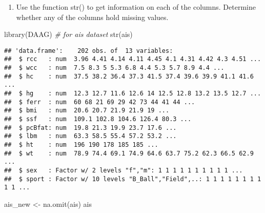 \documentclass[
]{article}
\newenvironment{Shaded}{\begin{snugshade}}{\end{snugshade}}
\newcommand{\CommentTok}[1]{\textcolor[rgb]{0.56,0.35,0.01}{\textit{#1}}}
\newcommand{\FunctionTok}[1]{\textcolor[rgb]{0.00,0.00,0.00}{#1}}
\newcommand{\NormalTok}[1]{#1}
\newcommand{\OtherTok}[1]{\textcolor[rgb]{0.56,0.35,0.01}{#1}}
\providecommand{\tightlist}{%
  \setlength{\itemsep}{0pt}\setlength{\parskip}{0pt}}
\begin{document}
\begin{enumerate}
\def\labelenumi{(\alph{enumi})}
\tightlist
\item
  Use the function str() to get information on each of the columns.
  Determine whether any of the columns hold missing values.
\end{enumerate}

\begin{Shaded}
\begin{Highlighting}[]
\FunctionTok{library}\NormalTok{(DAAG) }\CommentTok{\# for ais dataset}
\FunctionTok{str}\NormalTok{(ais)}
\end{Highlighting}
\end{Shaded}

\begin{verbatim}
## 'data.frame':    202 obs. of  13 variables:
##  $ rcc   : num  3.96 4.41 4.14 4.11 4.45 4.1 4.31 4.42 4.3 4.51 ...
##  $ wcc   : num  7.5 8.3 5 5.3 6.8 4.4 5.3 5.7 8.9 4.4 ...
##  $ hc    : num  37.5 38.2 36.4 37.3 41.5 37.4 39.6 39.9 41.1 41.6 ...
##  $ hg    : num  12.3 12.7 11.6 12.6 14 12.5 12.8 13.2 13.5 12.7 ...
##  $ ferr  : num  60 68 21 69 29 42 73 44 41 44 ...
##  $ bmi   : num  20.6 20.7 21.9 21.9 19 ...
##  $ ssf   : num  109.1 102.8 104.6 126.4 80.3 ...
##  $ pcBfat: num  19.8 21.3 19.9 23.7 17.6 ...
##  $ lbm   : num  63.3 58.5 55.4 57.2 53.2 ...
##  $ ht    : num  196 190 178 185 185 ...
##  $ wt    : num  78.9 74.4 69.1 74.9 64.6 63.7 75.2 62.3 66.5 62.9 ...
##  $ sex   : Factor w/ 2 levels "f","m": 1 1 1 1 1 1 1 1 1 1 ...
##  $ sport : Factor w/ 10 levels "B_Ball","Field",..: 1 1 1 1 1 1 1 1 1 1 ...
\end{verbatim}

\begin{Shaded}
\begin{Highlighting}[]
\NormalTok{ais\_new }\OtherTok{\textless{}{-}} \FunctionTok{na.omit}\NormalTok{(ais)}
\NormalTok{ais}
\end{Highlighting}
\end{Shaded}
\end{document}
